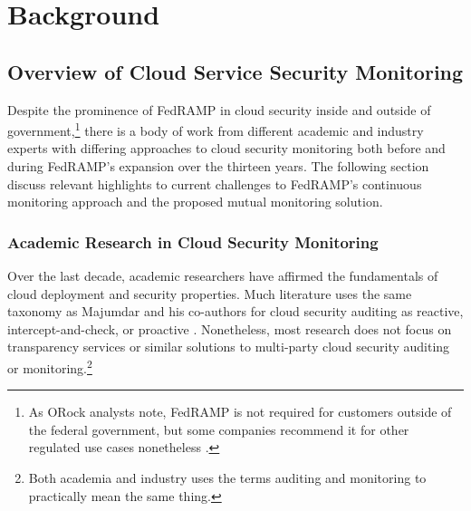 \documentclass{jdf}
\begin{document}
\section{Background}

\subsection{Overview of Cloud Service Security Monitoring}

Despite the prominence of FedRAMP in cloud security inside and outside of government,\footnote{As ORock analysts note, FedRAMP is not required for customers outside of the federal government, but some companies recommend it for other regulated use cases nonetheless \citeyear{orock21}.} there is a body of work from different academic and industry experts with differing approaches to cloud security monitoring both before and during FedRAMP's expansion over the thirteen years. The following section discuss relevant highlights to current challenges to FedRAMP's continuous monitoring approach and the proposed mutual monitoring solution.

\subsubsection{Academic Research in Cloud Security Monitoring}

Over the last decade, academic researchers have affirmed the fundamentals of cloud deployment and security properties. Much literature uses the same taxonomy as Majumdar and his co-authors for cloud security auditing as reactive, intercept-and-check, or proactive \citeyear[pp.~9-13]{majumdar19}. Nonetheless, most research does not focus on transparency services or similar solutions to multi-party cloud security auditing or monitoring.\footnote{Both academia and industry uses the terms auditing and monitoring to practically mean the same thing.}
\end{document}
